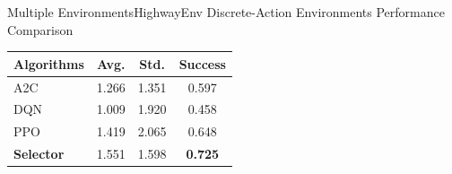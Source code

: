 \documentclass[aspectratio=169]{beamer}
\begin{document}
\begin{frame}{Multiple Environments}{HighwayEnv Discrete-Action Environments Performance Comparison}
  \centering
  \begin{tabular}{@{}lccc@{}}
    \toprule
    \textbf{Algorithms} & \textbf{Avg.} & \textbf{Std.} & \textbf{Success} \\
    \midrule
    A2C & 1.266 & 1.351 & 0.597 \\
    DQN & 1.009 & 1.920 & 0.458 \\
    PPO & 1.419 & 2.065 & 0.648 \\
    \textbf{Selector} & 1.551 & 1.598 & \textbf{0.725} \\
    \bottomrule
  \end{tabular}
\end{frame}
\end{document}

